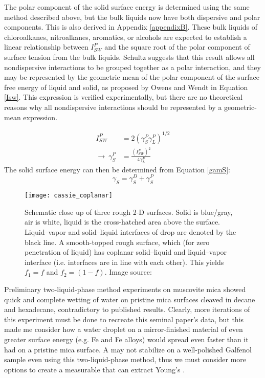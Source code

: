 
The polar component of the solid surface energy is determined using the same method described above,\cite{Schultz1977} but the bulk liquids now have both dispersive and polar components. This is also derived in Appendix \ref{appendixB}. These bulk liquids of chloroalkanes, nitroalkanes, aromatics, or alcohols are expected to establish a linear relationship between $I_{SW}^{P} $ and the square root of the polar component of surface tension from the bulk liquids. Schultz \etal suggests that this result allows all nondispersive interactions to be grouped together as a polar interaction, and they may be represented by the geometric mean of the polar component of the surface free energy of liquid and solid, as proposed by Owens and Wendt in Equation \ref{Isw}. This expression is verified experimentally, but there are no theoretical reasons why all nondispersive interactions should be represented by a geometric-mean expression.\cite{Fowkes1964}

\begin{equation}
\label{Isw}
	\begin{split}
	I_{SW}^{P} 							& = 2 (\gamma_{S}^{P}\gamma_{L}^{P})^{1/2} \\
	\rightarrow ~ \gamma_{S}^{P}	& = \frac{(I_{SW}^{P})^{2} }{4\gamma_{L}^{P}} 
	\end{split}
\end{equation}
The solid surface energy can then be determined from Equation \ref{gamS}:
\begin{equation}
\label{gamS}	\gamma_{S} = \gamma_{S}^{D} + \gamma_{S}^{P}	
\end{equation}

\begin{figure}[h]
	\centering
	\texttt{[image: cassie\_coplanar]}
	\caption{Schematic close up of three rough 2-D surfaces. Solid is blue/gray, air is white, liquid is the cross-hatched area above the surface. Liquid–vapor and solid–liquid interfaces of drop are denoted by the black line. A smooth-topped rough surface, which (for zero penetration of liquid) has coplanar solid–liquid and liquid–vapor interface (i.e. interfaces are in line with each other). This yields $ f_{1}=f $ and $ f_{2}=(1-f) $. Image source: \cite{Milne2012}}
	\label{fig:cassie_coplanar}
\end{figure}

Preliminary two-liquid-phase method experiments on muscovite mica showed quick and complete wetting of water on pristine mica surfaces cleaved in decane and hexadecane, contradictory to published results.\cite{Schultz1992} Clearly, more iterations of this experiment must be done to recreate this seminal paper's data, but this made me consider how a water droplet on a mirror-finished material of even greater surface energy (e.g. Fe and Fe alloys) would spread even faster than it had on a pristine mica surface. A \ca may not stabilize on a well-polished Galfenol sample even using this two-liquid-phase method, thus we must consider more options to create a measurable \ca that can extract Young's \ca. 

